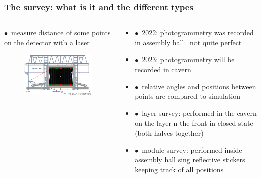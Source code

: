 \documentclass[aspectratio=1610, 12pt]{beamer}
\begin{document}
\begin{frame}\frametitle{The survey: what is it and the different types}
  \begin{columns}
    \begin{column}[c]{0.48\textwidth}
      $\bullet$\, measure distance of some points on the detector with a laser
      \begin{figure}
        \centering
        \includegraphics[width=\textwidth]{logos/survey.png}
      \end{figure}
    \end{column}
    \begin{column}[c]{0.48\textwidth}
      \begin{itemize}
        \item $\bullet$\, 2022: photogrammetry was recorded in assembly hall \to\, not quite perfect
        \item $\bullet$\, 2023: photogrammetry will be recorded in cavern
        \item $\bullet$\, relative angles and positions between points are compared to simulation
        \item $\bullet$\, layer survey: performed in the cavern on the layer n the front in closed state (both halves together)
        \item $\bullet$\, module survey: performed inside assembly hall sing reflective stickers keeping track of all positions
      \end{itemize}
    \end{column}
  \end{columns}
\end{frame}
\end{document}
